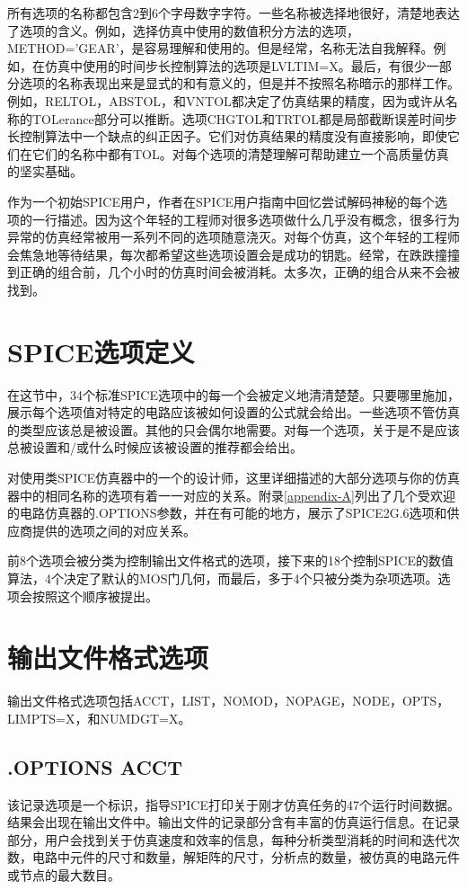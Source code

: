 所有选项的名称都包含2到6个字母数字字符。一些名称被选择地很好，清楚地表达了选项的含义。例如，选择仿真中使用的数值积分方法的选项， METHOD='GEAR'，是容易理解和使用的。但是经常，名称无法自我解释。例如，在仿真中使用的时间步长控制算法的选项是LVLTIM=X。最后，有很少一部分选项的名称表现出来是显式的和有意义的，但是并不按照名称暗示的那样工作。例如，RELTOL，ABSTOL，和VNTOL都决定了仿真结果的精度，因为或许从名称的TOLerance部分可以推断。选项CHGTOL和TRTOL都是局部截断误差时间步长控制算法中一个缺点的纠正因子。它们对仿真结果的精度没有直接影响，即使它们在它们的名称中都有TOL。对每个选项的清楚理解可帮助建立一个高质量仿真的坚实基础。

作为一个初始SPICE用户，作者在SPICE用户指南\cite{chap6-1}中回忆尝试解码神秘的每个选项的一行描述。因为这个年轻的工程师对很多选项做什么几乎没有概念，很多行为异常的仿真经常被用一系列不同的选项随意浇灭。对每个仿真，这个年轻的工程师会焦急地等待结果，每次都希望这些选项设置会是成功的钥匙。经常，在跌跌撞撞到正确的组合前，几个小时的仿真时间会被消耗。太多次，正确的组合从来不会被找到。

\section{SPICE选项定义}
在这节中，34个标准SPICE选项中的每一个会被定义地清清楚楚。只要哪里施加，展示每个选项值对特定的电路应该被如何设置的公式就会给出。一些选项不管仿真的类型应该总是被设置。其他的只会偶尔地需要。对每一个选项，关于是不是应该总被设置和/或什么时候应该被设置的推荐都会给出。

对使用类SPICE仿真器中的一个的设计师，这里详细描述的大部分选项与你的仿真器中的相同名称的选项有着一一对应的关系。附录\ref{appendix-A}列出了几个受欢迎的电路仿真器的.OPTIONS参数，并在有可能的地方，展示了SPICE2G.6选项和供应商提供的选项之间的对应关系。

前8个选项会被分类为控制输出文件格式的选项，接下来的18个控制SPICE的数值算法，4个决定了默认的MOS门几何，而最后，多于4个只被分类为杂项选项。选项会按照这个顺序被提出。

\section{输出文件格式选项}
输出文件格式选项包括ACCT，LIST，NOMOD，NOPAGE，NODE，OPTS，LIMPTS=X，和NUMDGT=X。

\subsection{.OPTIONS ACCT}
该记录选项是一个标识，指导SPICE打印关于刚才仿真任务的47个运行时间数据。结果会出现在输出文件中。输出文件的记录部分含有丰富的仿真运行信息。在记录部分，用户会找到关于仿真速度和效率的信息，每种分析类型消耗的时间和迭代次数，电路中元件的尺寸和数量，解矩阵的尺寸，分析点的数量，被仿真的电路元件或节点的最大数目。

